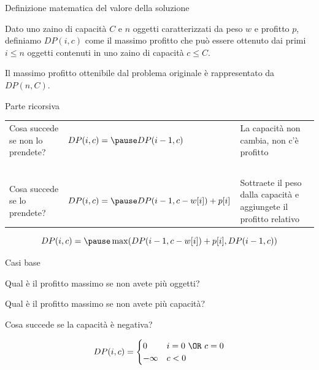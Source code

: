 \begin{frame}{Definizione matematica del valore della soluzione}

\vspace{-9pt}
\begin{myboxtitle}
Dato uno zaino di capacità $C$ e $n$ oggetti caratterizzati
da peso $w$ e profitto $p$, definiamo $DP(i,c)$ come il
massimo profitto che può essere ottenuto dai primi $i \leq n$
oggetti contenuti in uno zaino di capacità $c \leq C$.
\end{myboxtitle}

\begin{myboxtitle}
Il massimo profitto ottenibile dal problema originale è rappresentato da $DP(n, C)$.
\end{myboxtitle}

\end{frame}


\begin{frame}{Parte ricorsiva}

\vspace{-9pt}

\bigskip
\begingroup
\renewcommand*{\arraystretch}{1.2}
\begin{tabular}{P{2.8cm}P{3.9cm}P{4.0cm}}
Cosa succede se non lo prendete? & $DP(i,c) = \pause\newline DP(i-1,c)$ & La capacità non cambia, non c'è profitto \\
~\\
Cosa succede se lo prendete? & $DP(i,c) = \pause DP(i-1,c-w[i]) + p[i]$ & Sottraete il peso dalla capacità e aggiungete il profitto relativo \\
\end{tabular}
\endgroup


\[
DP(i,c) = \pause \max( DP(i-1,c-w[i]) + p[i], DP(i-1,c) )
\]

\end{frame}


\begin{frame}{Casi base}

\vspace{-9pt}

\pause
\BIL
\item Qual è il profitto massimo se non avete più oggetti?
\item Qual è il profitto massimo se non avete più capacità?
\item Cosa succede se la capacità è negativa?
\EIL

\pause
\[
DP(i,c) = \begin{cases}
  0 & i=0\ \OR\ c=0 \\
  -\infty & c < 0
\end{cases}
\]

\end{frame}

